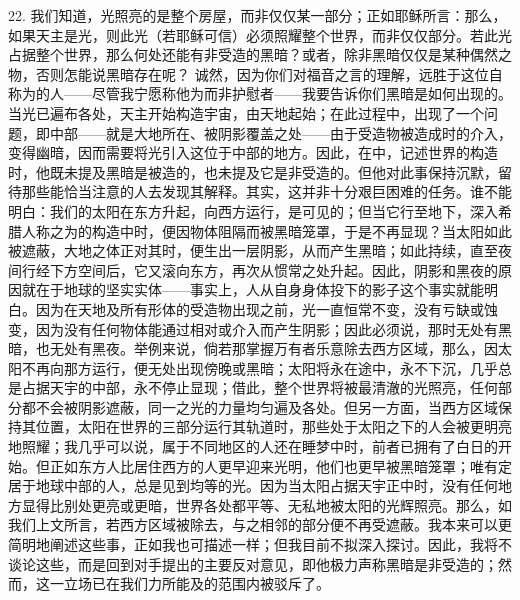 22. 我们知道，光照亮的是整个房屋，而非仅仅某一部分；正如耶稣所言：那么，如果天主是光，则此光（若耶稣可信）必须照耀整个世界，而非仅仅部分。若此光占据整个世界，那么何处还能有非受造的黑暗？或者，除非黑暗仅仅是某种偶然之物，否则怎能说黑暗存在呢？ 诚然，因为你们对福音之言的理解，远胜于这位自称为的人——尽管我宁愿称他为而非护慰者——我要告诉你们黑暗是如何出现的。当光已遍布各处，天主开始构造宇宙，由天地起始；在此过程中，出现了一个问题，即中部——就是大地所在、被阴影覆盖之处——由于受造物被造成时的介入，变得幽暗，因而需要将光引入这位于中部的地方。因此，在中，记述世界的构造时，他既未提及黑暗是被造的，也未提及它是非受造的。但他对此事保持沉默，留待那些能恰当注意的人去发现其解释。其实，这并非十分艰巨困难的任务。谁不能明白：我们的太阳在东方升起，向西方运行，是可见的；但当它行至地下，深入希腊人称之为的构造中时，便因物体阻隔而被黑暗笼罩，于是不再显现？当太阳如此被遮蔽，大地之体正对其时，便生出一层阴影，从而产生黑暗；如此持续，直至夜间行经下方空间后，它又滚向东方，再次从惯常之处升起。因此，阴影和黑夜的原因就在于地球的坚实实体——事实上，人从自身身体投下的影子这个事实就能明白。因为在天地及所有形体的受造物出现之前，光一直恒常不变，没有亏缺或蚀变，因为没有任何物体能通过相对或介入而产生阴影；因此必须说，那时无处有黑暗，也无处有黑夜。举例来说，倘若那掌握万有者乐意除去西方区域，那么，因太阳不再向那方运行，便无处出现傍晚或黑暗；太阳将永在途中，永不下沉，几乎总是占据天宇的中部，永不停止显现；借此，整个世界将被最清澈的光照亮，任何部分都不会被阴影遮蔽，同一之光的力量均匀遍及各处。但另一方面，当西方区域保持其位置，太阳在世界的三部分运行其轨道时，那些处于太阳之下的人会被更明亮地照耀；我几乎可以说，属于不同地区的人还在睡梦中时，前者已拥有了白日的开始。但正如东方人比居住西方的人更早迎来光明，他们也更早被黑暗笼罩；唯有定居于地球中部的人，总是见到均等的光。因为当太阳占据天宇正中时，没有任何地方显得比别处更亮或更暗，世界各处都平等、无私地被太阳的光辉照亮。那么，如我们上文所言，若西方区域被除去，与之相邻的部分便不再受遮蔽。我本来可以更简明地阐述这些事，正如我也可描述一样；但我目前不拟深入探讨。因此，我将不谈论这些，而是回到对手提出的主要反对意见，即他极力声称黑暗是非受造的；然而，这一立场已在我们力所能及的范围内被驳斥了。\par

